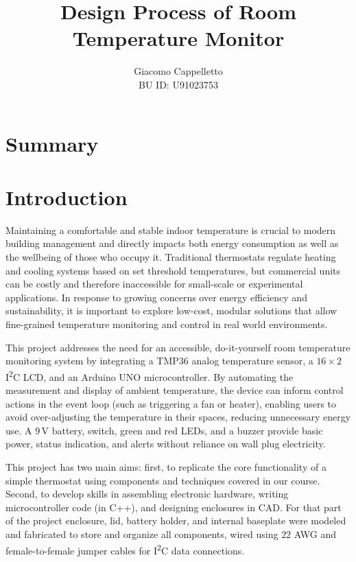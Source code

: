 \documentclass[10pt]{article}
\title{Design Process of Room Temperature Monitor} \author{Giacomo Cappelletto\\ BU ID: U91023753} %
\date{}
\begin{document}
 \maketitle

\section{Summary}
\noindent

\section{Introduction}

Maintaining a comfortable and stable indoor temperature
is crucial to modern building management and directly impacts both energy
consumption as well as the wellbeing of those who occupy it. Traditional thermostats regulate heating and
cooling systems based on set threshold temperatures, but commercial units can be costly
and therefore inaccessible for small-scale or experimental applications. In response to
growing concerns over energy efficiency and sustainability, it is important to
explore low-cost, modular solutions that allow fine-grained temperature
monitoring and control in real world environments.

This project addresses the need for an accessible, do-it-yourself room
temperature monitoring system by integrating a TMP36 analog temperature sensor,
a $16\times 2$ I\textsuperscript{2}C LCD, and an Arduino UNO microcontroller. By
automating the measurement and display of ambient temperature, the device can
inform control actions in the event loop (such as triggering a fan or heater),
enabling users to avoid over-adjusting the temperature in their spaces, reducing
unnecessary energy use. A $9\,$V battery, switch, green and red LEDs, and a
buzzer provide basic power, status indication, and alerts without reliance on
wall plug electricity.

This project has two main aims: first, to replicate the core functionality of a
simple thermostat using components and techniques covered in our course. Second,
to develop skills in assembling electronic hardware, writing
microcontroller code (in C++), and designing enclosures in CAD. For that part of the project
enclosure, lid, battery holder, and internal baseplate were modeled and
fabricated to store and organize all components, wired using $22$ AWG and
female-to-female jumper cables for I\textsuperscript{2}C data connections.
\end{document}
